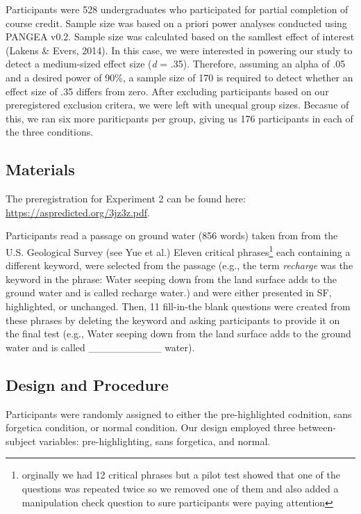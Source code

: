 \documentclass[pdf]{apa6}
\begin{document}
Participants were 528 undergraduates who participated for partial completion of course credit. Sample size was based on a priori power analyses conducted using PANGEA v0.2. Sample size was calculated based on the samllest effect of interest (Lakens \& Evers, 2014). In this case, we were interested in powering our study to detect a medium-sized effect size (\emph{d} = .35). Therefore, assuming an alpha of .05 and a desired power of 90\%, a sample size of 170 is required to detect whether an effect size of .35 differs from zero. After excluding participants based on our preregistered exclusion critera, we were left with unequal group sizes. Becasue of this, we ran six more pariticpants per group, giving us 176 participants in each of the three conditions.

\hypertarget{materials-1}{%
\subsection{Materials}\label{materials-1}}

The preregistration for Experiment 2 can be found here: \url{https://aspredicted.org/3jz3z.pdf}.

Participants read a passage on ground water (856 words) taken from from the U.S. Geological Survey (see Yue et al.) Eleven critical phrases\footnote{orginally we had 12 critical phrases but a pilot test showed that one of the questions was repeated twice so we removed one of them and also added a manipulation check question to sure participants were paying attention} each containing a different keyword, were selected from the passage (e.g., the term \emph{recharge} was the keyword in the phrase: Water seeping down from the land surface adds to the ground water and is called recharge water.) and were either presented in SF, highlighted, or unchanged. Then, 11 fill-in-the blank questions were created from these phrases by deleting the keyword and asking participants to provide it on the final test (e.g., Water seeping down from the land surface adds to the ground water and is called \_\_\_\_\_\_\_\_\_\_ water).

\hypertarget{design-and-procedure-1}{%
\subsection{Design and Procedure}\label{design-and-procedure-1}}

Participants were randomly assigned to either the pre-highlighted codnition, sans forgetica condition, or normal condition. Our design employed three between-subject variables: pre-highlighting, sans forgetica, and normal.
\end{document}
